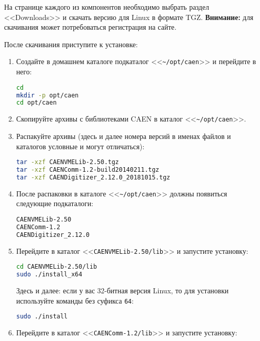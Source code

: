 \documentclass[12pt, a4paper, oneside, onecolumn]{book}
\newcommand{\DIRECTORY}[1]{<<{\tt #1}>>}
\newcommand{\NOTE}{{\bf Внимание:}}
\begin{document}
На странице каждого из компонентов необходимо выбрать раздел <<Downloads>> и скачать версию для Linux в формате TGZ. \NOTE{} для скачивания может потребоваться регистрация на сайте.

После скачивания приступите к установке:

\begin{enumerate}

\item Создайте в домашнем каталоге подкаталог \DIRECTORY{\~{}/opt/caen} и перейдите в него:

\begin{lstlisting}[language=bash]
cd
mkdir -p opt/caen
cd opt/caen
\end{lstlisting}

\item Скопируйте архивы с библиотеками CAEN в каталог \DIRECTORY{\~{}/opt/caen}.

\item Распакуйте архивы (здесь и далее номера версий в именах файлов и каталогов условные и могут отличаться):

\begin{lstlisting}[language=bash]
tar -xzf CAENVMELib-2.50.tgz
tar -xzf CAENComm-1.2-build20140211.tgz
tar -xzf CAENDigitizer_2.12.0_20181015.tgz
\end{lstlisting}

\item После распаковки в каталоге \DIRECTORY{\~{}/opt/caen} должны появиться следующие подкаталоги:

\begin{lstlisting}[language=bash]
CAENVMELib-2.50
CAENComm-1.2
CAENDigitizer_2.12.0
\end{lstlisting}

\item Перейдите в каталог \DIRECTORY{CAENVMELib-2.50/lib} и запустите установку:

\begin{lstlisting}[language=bash]
cd CAENVMELib-2.50/lib
sudo ./install_x64
\end{lstlisting}

Здесь и далее: если у вас 32-битная версия Linux, то для установки используйте команды без суфикса {\tt 64}:

\begin{lstlisting}[language=bash]
sudo ./install
\end{lstlisting}

\item Перейдите в каталог \DIRECTORY{CAENComm-1.2/lib} и запустите установку:


\end{enumerate}
\end{document}
